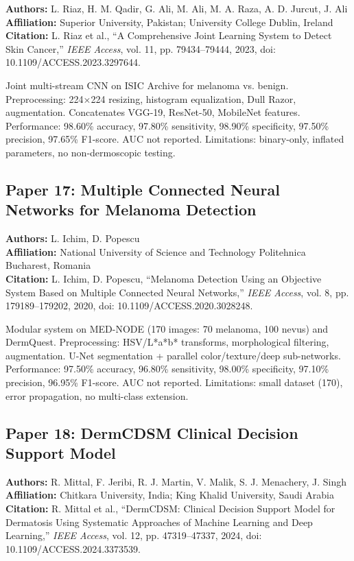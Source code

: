 \documentclass[conference]{IEEEtran}
\begin{document}
\noindent\textbf{Authors:} L. Riaz, H. M. Qadir, G. Ali, M. Ali, M. A. Raza, A. D. Jurcut, J. Ali\\
\textbf{Affiliation:} Superior University, Pakistan; University College Dublin, Ireland\\
\textbf{Citation:} L. Riaz et al., ``A Comprehensive Joint Learning System to Detect Skin Cancer,'' \textit{IEEE Access}, vol. 11, pp. 79434--79444, 2023, doi: 10.1109/ACCESS.2023.3297644.

Joint multi-stream CNN on ISIC Archive for melanoma vs. benign. Preprocessing: 224×224 resizing, histogram equalization, Dull Razor, augmentation. Concatenates VGG-19, ResNet-50, MobileNet features. Performance: 98.60\% accuracy, 97.80\% sensitivity, 98.90\% specificity, 97.50\% precision, 97.65\% F1-score. AUC not reported. Limitations: binary-only, inflated parameters, no non-dermoscopic testing.

\subsection{Paper 17: Multiple Connected Neural Networks for Melanoma Detection}

\noindent\textbf{Authors:} L. Ichim, D. Popescu\\
\textbf{Affiliation:} National University of Science and Technology Politehnica Bucharest, Romania\\
\textbf{Citation:} L. Ichim, D. Popescu, ``Melanoma Detection Using an Objective System Based on Multiple Connected Neural Networks,'' \textit{IEEE Access}, vol. 8, pp. 179189--179202, 2020, doi: 10.1109/ACCESS.2020.3028248.

Modular system on MED-NODE (170 images: 70 melanoma, 100 nevus) and DermQuest. Preprocessing: HSV/L*a*b* transforms, morphological filtering, augmentation. U-Net segmentation + parallel color/texture/deep sub-networks. Performance: 97.50\% accuracy, 96.80\% sensitivity, 98.00\% specificity, 97.10\% precision, 96.95\% F1-score. AUC not reported. Limitations: small dataset (170), error propagation, no multi-class extension.

\subsection{Paper 18: DermCDSM Clinical Decision Support Model}

\noindent\textbf{Authors:} R. Mittal, F. Jeribi, R. J. Martin, V. Malik, S. J. Menachery, J. Singh\\
\textbf{Affiliation:} Chitkara University, India; King Khalid University, Saudi Arabia\\
\textbf{Citation:} R. Mittal et al., ``DermCDSM: Clinical Decision Support Model for Dermatosis Using Systematic Approaches of Machine Learning and Deep Learning,'' \textit{IEEE Access}, vol. 12, pp. 47319--47337, 2024, doi: 10.1109/ACCESS.2024.3373539.
\end{document}
